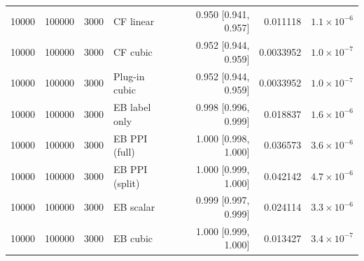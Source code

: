 {\begin{longtable}{rrrlrrr}
10000 & 100000 & 3000 & CF linear & 0.950 [0.941, 0.957] & 0.011118 & $1.1\times 10^{-6}$ \\
10000 & 100000 & 3000 & CF cubic & 0.952 [0.944, 0.959] & 0.0033952 & $1.0\times 10^{-7}$ \\
10000 & 100000 & 3000 & Plug-in cubic & 0.952 [0.944, 0.959] & 0.0033952 & $1.0\times 10^{-7}$ \\
10000 & 100000 & 3000 & EB label only & 0.998 [0.996, 0.999] & 0.018837 & $1.6\times 10^{-6}$ \\
10000 & 100000 & 3000 & EB PPI (full) & 1.000 [0.998, 1.000] & 0.036573 & $3.6\times 10^{-6}$ \\
10000 & 100000 & 3000 & EB PPI (split) & 1.000 [0.999, 1.000] & 0.042142 & $4.7\times 10^{-6}$ \\
10000 & 100000 & 3000 & EB scalar & 0.999 [0.997, 0.999] & 0.024114 & $3.3\times 10^{-6}$ \\
10000 & 100000 & 3000 & EB cubic & 1.000 [0.999, 1.000] & 0.013427 & $3.4\times 10^{-7}$ \\
\end{longtable}}
